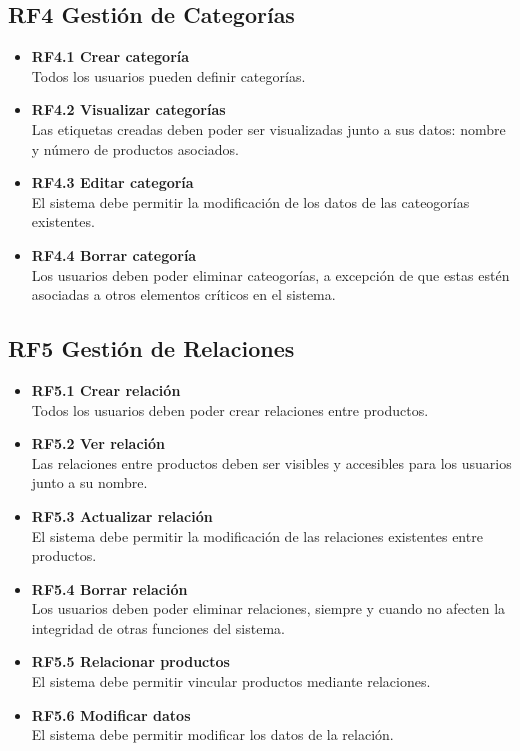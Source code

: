 \documentclass[12pt.a4paper]{article}
\begin{document}
\subsection*{RF4 Gestión de Categorías}

\begin{itemize}
    \item \textbf{RF4.1 Crear categoría} \\
    Todos los usuarios pueden definir categorías.

    \item \textbf{RF4.2 Visualizar categorías} \\
    Las etiquetas creadas deben poder ser visualizadas junto a sus datos: nombre y número de productos asociados.

    \item \textbf{RF4.3 Editar categoría} \\
    El sistema debe permitir la modificación de los datos de las cateogorías existentes.

    \item \textbf{RF4.4 Borrar categoría} \\
    Los usuarios deben poder eliminar cateogorías, a excepción de que estas estén asociadas a otros elementos críticos en el sistema.
\end{itemize}

\subsection*{RF5 Gestión de Relaciones}

\begin{itemize}
    \item \textbf{RF5.1 Crear relación} \\
    Todos los usuarios deben poder crear relaciones entre productos.

    \item \textbf{RF5.2 Ver relación} \\
    Las relaciones entre productos deben ser visibles y accesibles para los usuarios junto a su nombre.

    \item \textbf{RF5.3 Actualizar relación} \\
    El sistema debe permitir la modificación de las relaciones existentes entre productos.

    \item \textbf{RF5.4 Borrar relación} \\
    Los usuarios deben poder eliminar relaciones, siempre y cuando no afecten la integridad de otras funciones del sistema.

    \item \textbf{RF5.5 Relacionar productos} \\
    El sistema debe permitir vincular productos mediante relaciones.
    
    \item \textbf{RF5.6 Modificar datos} \\
    El sistema debe permitir modificar los datos de la relación.
    
\end{itemize}
\end{document}
